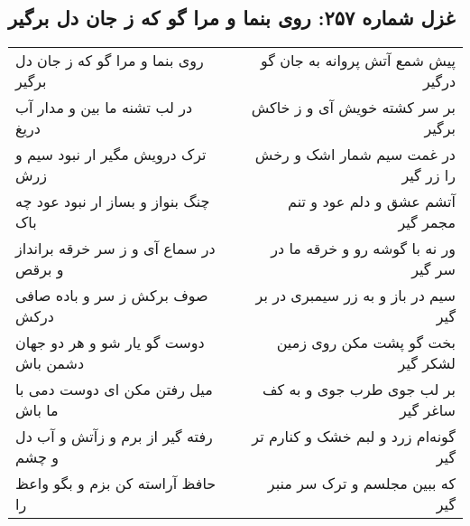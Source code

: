 \begin{center}
\section*{غزل شماره ۲۵۷: روی بنما و مرا گو که ز جان دل برگیر}
\label{sec:sh257}
\begin{longtable}{l p{0.5cm} r}
روی بنما و مرا گو که ز جان دل برگیر
&&
پیش شمع آتش پروانه به جان گو درگیر
\\
در لب تشنه ما بین و مدار آب دریغ
&&
بر سر کشته خویش آی و ز خاکش برگیر
\\
ترک درویش مگیر ار نبود سیم و زرش
&&
در غمت سیم شمار اشک و رخش را زر گیر
\\
چنگ بنواز و بساز ار نبود عود چه باک
&&
آتشم عشق و دلم عود و تنم مجمر گیر
\\
در سماع آی و ز سر خرقه برانداز و برقص
&&
ور نه با گوشه رو و خرقه ما در سر گیر
\\
صوف برکش ز سر و باده صافی درکش
&&
سیم در باز و به زر سیمبری در بر گیر
\\
دوست گو یار شو و هر دو جهان دشمن باش
&&
بخت گو پشت مکن روی زمین لشکر گیر
\\
میل رفتن مکن ای دوست دمی با ما باش
&&
بر لب جوی طرب جوی و به کف ساغر گیر
\\
رفته گیر از برم و زآتش و آب دل و چشم
&&
گونه‌ام زرد و لبم خشک و کنارم تر گیر
\\
حافظ آراسته کن بزم و بگو واعظ را
&&
که ببین مجلسم و ترک سر منبر گیر
\\
\end{longtable}
\end{center}
